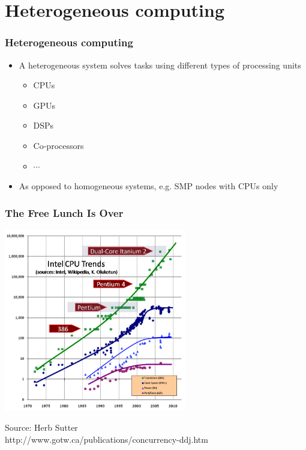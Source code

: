\documentclass[10pt,t]{beamer}
\begin{document}
\section{Heterogeneous computing}
\begin{frame}
  \frametitle{Heterogeneous computing}
  \begin{itemize}
  \item A heterogeneous system solves tasks using different types of processing units
    \begin{itemize}
    \item CPUs
    \item GPUs
    \item DSPs
    \item Co-processors
    \item $\cdots$
    \end{itemize}
  \item As opposed to homogeneous systems, e.g. SMP nodes with CPUs only
  \end{itemize}
\end{frame}

\begin{frame}
  \frametitle{The Free Lunch Is Over}
  \begin{center}
    \includegraphics[width=0.6\textwidth]{CPUTrend}
    
    
    \tiny{Source: Herb Sutter\\
      http://www.gotw.ca/publications/concurrency-ddj.htm}
  \end{center}
\end{frame}
\end{document}
